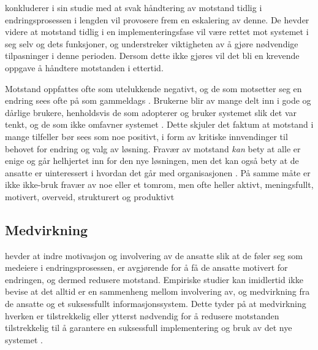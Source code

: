 \noindent
\citet{Lapointe05} konkluderer i sin studie med at svak håndtering av motstand tidlig i endringsprosessen i lengden vil provosere frem en eskalering av denne. De hevder videre at motstand tidlig i en implementeringsfase vil være rettet mot systemet i seg selv og dets funksjoner, og understreker viktigheten av å gjøre nødvendige tilpasninger i denne perioden. Dersom dette ikke gjøres vil det bli en krevende oppgave å håndtere motstanden i ettertid.
 
\noindent
Motstand oppfattes ofte som utelukkende negativt, og de som motsetter seg en endring sees ofte på som gammeldags \citep{Jacobsen12}. Brukerne blir av mange delt inn i gode og  dårlige brukere, henholdsvis de som adopterer og bruker systemet slik det var tenkt, og de som ikke omfavner systemet \citep{Satchell09}. Dette skjuler det faktum at motstand i mange tilfeller bør sees som noe positivt, i form av kritiske innvendinger til behovet for endring og valg av løsning. Fravær av motstand \textit{kan} bety at alle er enige og går helhjertet inn for den nye løsningen, men det kan også bety at de ansatte er uinteressert i hvordan det går med organisasjonen \citep{Jacobsen12}. På samme måte er ikke ikke-bruk fravær av noe eller et tomrom, men ofte heller aktivt, meningsfullt, motivert, overveid, strukturert og produktivt \citep{Satchell09}
 
\subsection{Medvirkning}
\label{sec:medvirkning}
\citet{Jacobsen12} hevder at indre motivasjon og involvering av de ansatte slik at de føler seg som medeiere i endringsprosessen, er avgjørende for å få de ansatte motivert for endringen, og dermed redusere motstand. Empiriske studier kan imidlertid ikke bevise at det alltid er en sammenheng mellom involvering av, og medvirkning fra de ansatte og et suksessfullt informasjonssystem. Dette tyder på at medvirkning hverken er tilstrekkelig eller ytterst nødvendig for å redusere motstanden tilstrekkelig til å garantere en suksessfull implementering og bruk av det nye systemet \citep{Cavaye95}.
 

